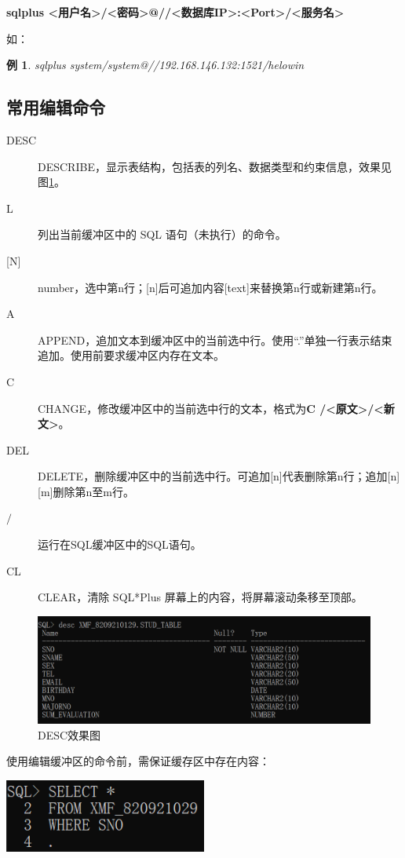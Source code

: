 \documentclass[11pt, a4paper, oneside, UTF8]{ctexbook}
\let\kaishu\relax %
\newtheorem{example}[theorem]{例}
\begin{document}
{\bfseries\kaishu sqlplus <用户名>/<密码>@//<数据库IP>:<Port>/<服务名>}

如：
\begin{example}
  sqlplus system/system@//192.168.146.132:1521/helowin
\end{example}

\subsection{常用编辑命令}
\begin{description}
  \item[DESC] DESCRIBE，显示表结构，包括表的列名、数据类型和约束信息，效果见图\ref{fig:DESC_SQLPLUS}。
  \item[L] 列出当前缓冲区中的 SQL 语句（未执行）的命令。
  \item[\textup{[N]}] number，选中第n行；[n]后可追加内容[text]来替换第n行或新建第n行。
  \item[A] APPEND，追加文本到缓冲区中的当前选中行。使用“.”单独一行表示结束追加。使用前要求缓冲区内存在文本。
  \item[C] CHANGE，修改缓冲区中的当前选中行的文本，格式为{\bfseries\kaishu C /<原文>/<新文>}。
  \item[DEL] DELETE，删除缓冲区中的当前选中行。可追加[n]代表删除第n行；追加[n][m]删除第n至m行。
  \item[$\boldsymbol{/}$] 运行在SQL缓冲区中的SQL语句。
  \item[CL] CLEAR，清除 SQL*Plus 屏幕上的内容，将屏幕滚动条移至顶部。
\end{description}
\begin{figure}[htbp]
  \center
  \includegraphics[width=\textwidth]{picture/DESC_SQLPLUS效果.png}
  \caption{DESC效果图}
  \label{fig:DESC_SQLPLUS}
\end{figure}

使用编辑缓冲区的命令前，需保证缓存区中存在内容：

\begin{center}
  \begin{minipage}{\textwidth}
    \center
    \includegraphics[width=0.5\textwidth]{picture/输入内容到缓冲区.png}
    \captionsetup{hypcap=false}
    \label{fig:输入内容到缓冲区}
  \end{minipage}
\end{center}
\end{document}
